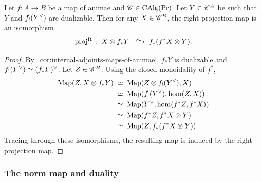 \documentclass[english,svgnames,table]{article}
\begin{document}
    \begin{lemma}
    \label{lem:Y-and-f!Y-dual-projection}
        Let $f \colon A \to B$ be a map of animae and $\mathscr{C} \in \operatorname{CAlg}(\operatorname{Pr})$. Let $Y \in \mathscr{C}^A$ be such that $Y$ and $f_!(Y^{\vee})$ are dualizable. Then for any $X \in \mathscr{C}^B$, the right projection map is an isomorphism
        \begin{equation*}
            \Rproj \;\colon\; X \otimes f_* Y \;\isotoo\; f_*(f^* X \otimes Y).
        \end{equation*}
    \end{lemma}
    \begin{proof}
        By~\cref{cor:internal-adjoints-maps-of-animae}, $f_*Y$ is dualizable and $f_!(Y^{\vee}) \simeq (f_*Y)^{\vee}$. Let $Z \in \mathscr{C}^B$. Using the closed monoidality of $f^*$,
        \begin{equation*}
            \begin{split}
                \operatorname{Map}(Z, X \otimes f_* Y) 
                &\;\simeq\; \operatorname{Map}(Z \otimes f_!(Y^{\vee}), X) \\
                & \;\simeq\; \operatorname{Map}(f_!(Y^{\vee}), \hom(Z, X)) \\
                & \;\simeq\; \operatorname{Map}(Y^{\vee}, \hom(f^* Z, f^* X)) \\
                & \;\simeq\; \operatorname{Map}(f^* Z, f^* X \otimes Y) \\
                & \;\simeq\; \operatorname{Map}(Z, f_*(f^* X \otimes Y)).
            \end{split}
        \end{equation*}
        Tracing through these isomorphisms, the resulting map is induced by the right projection map.
    \end{proof}


    \subsubsection*{The norm map and duality}
\end{document}
